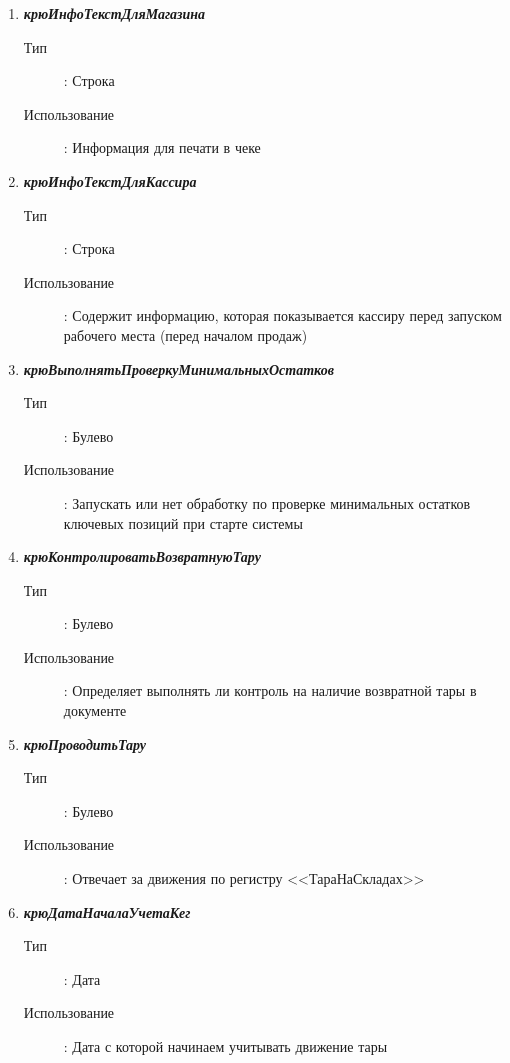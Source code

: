 \begin{enumerate}[label=(\arabic*)]
\vspace{\baselineskip}
\item \textbf{\textit{крюИнфоТекстДляМагазина}}
\begin{description}
	\item[Тип] : Строка
	\item[Использование]: Информация для печати в чеке
\end{description}

\vspace{\baselineskip}
\item \textbf{\textit{крюИнфоТекстДляКассира}}
\begin{description}
	\item[Тип] : Строка
	\item[Использование]: Содержит информацию, которая показывается кассиру перед запуском рабочего места (перед началом продаж)
\end{description}


\vspace{\baselineskip}
\item \textbf{\textit{крюВыполнятьПроверкуМинимальныхОстатков}}
\begin{description}
	\item[Тип] : Булево
	\item[Использование]: Запускать или нет обработку по проверке минимальных остатков ключевых позиций при старте системы
\end{description}


\vspace{\baselineskip}
\item \textbf{\textit{крюКонтролироватьВозвратнуюТару}}
\begin{description}
	\item[Тип] : Булево
	\item[Использование]: Определяет выполнять ли контроль на наличие возвратной тары в документе
\end{description}


\vspace{\baselineskip}
\item \textbf{\textit{крюПроводитьТару}}
\begin{description}
	\item[Тип] : Булево
	\item[Использование]: Отвечает за движения по регистру <<ТараНаСкладах>>
\end{description}

\vspace{\baselineskip}
\item \textbf{\textit{крюДатаНачалаУчетаКег}}
\begin{description}
    \item[Тип] : Дата
    \item[Использование]: Дата с которой начинаем учитывать движение тары
\end{description}


\end{enumerate}
